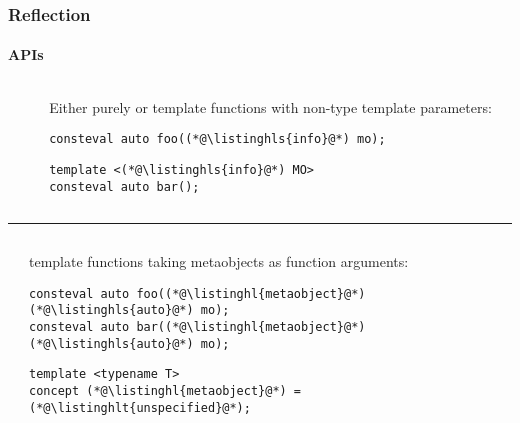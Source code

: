 \documentclass[compress,table,xcolor=table]{beamer}
\begin{document}
\begin{frame}[fragile]
  \frametitle{Reflection}
  \framesubtitle{APIs}
  \begin{columns}
    \begin{column}{.05\textwidth}
    \end{column}
    \begin{column}{.85\textwidth}
    \normalsize
    Either purely  or template functions with
    non-type template parameters:
    \begin{lstlisting}[language=c++2x,basicstyle=\normalsize\ttfamily]
consteval auto foo((*@\listinghls{info}@*) mo);
    \end{lstlisting}
    \begin{lstlisting}[language=c++2x,basicstyle=\normalsize\ttfamily]
template <(*@\listinghls{info}@*) MO>
consteval auto bar();
    \end{lstlisting}
    \end{column}
  \end{columns}
  \hrule
  \vfill
  \begin{columns}
    \begin{column}{.05\textwidth}
    \end{column}
    \begin{column}{.85\textwidth}
    \normalsize
    \normalsize
     template functions taking metaobjects as function arguments:
    \begin{lstlisting}[language=c++2x,basicstyle=\normalsize\ttfamily]
consteval auto foo((*@\listinghl{metaobject}@*) (*@\listinghls{auto}@*) mo);
consteval auto bar((*@\listinghl{metaobject}@*) (*@\listinghls{auto}@*) mo);
    \end{lstlisting}
    \begin{lstlisting}[language=c++2x,basicstyle=\normalsize\ttfamily]
template <typename T>
concept (*@\listinghl{metaobject}@*) = (*@\listinghlt{unspecified}@*);
    \end{lstlisting}
    \end{column}
  \end{columns}
\end{frame}
\end{document}
